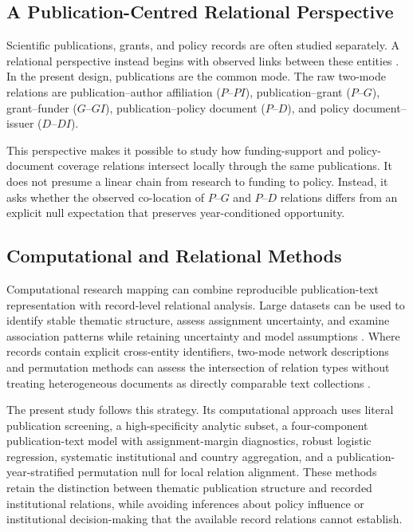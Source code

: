 \documentclass[12pt]{article}
\begin{document}
\subsection{A Publication-Centred Relational Perspective}

Scientific publications, grants, and policy records are often studied separately. A relational perspective instead begins with observed links between these entities \citep{nag2013,gutirrezsnchez2025,almeida2006}. In the present design, publications are the common mode. The raw two-mode relations are publication--author affiliation ($P$--$PI$), publication--grant ($P$--$G$), grant--funder ($G$--$GI$), publication--policy document ($P$--$D$), and policy document--issuer ($D$--$DI$).

This perspective makes it possible to study how funding-support and policy-document coverage relations intersect locally through the same publications. It does not presume a linear chain from research to funding to policy. Instead, it asks whether the observed co-location of $P$--$G$ and $P$--$D$ relations differs from an explicit null expectation that preserves year-conditioned opportunity.

\subsection{Computational and Relational Methods}

Computational research mapping can combine reproducible publication-text representation with record-level relational analysis. Large datasets can be used to identify stable thematic structure, assess assignment uncertainty, and examine association patterns while retaining uncertainty and model assumptions \citep{khurana2023,zhang2025,rashid2019}. Where records contain explicit cross-entity identifiers, two-mode network descriptions and permutation methods can assess the intersection of relation types without treating heterogeneous documents as directly comparable text collections \citep{kortum2021,jose2025}.

The present study follows this strategy. Its computational approach uses literal publication screening, a high-specificity analytic subset, a four-component publication-text model with assignment-margin diagnostics, robust logistic regression, systematic institutional and country aggregation, and a publication-year-stratified permutation null for local relation alignment. These methods retain the distinction between thematic publication structure and recorded institutional relations, while avoiding inferences about policy influence or institutional decision-making that the available record relations cannot establish.
\end{document}
